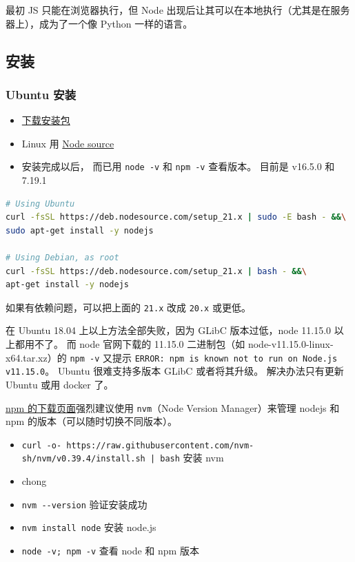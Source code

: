 

最初 JS 只能在浏览器执行，但 Node 出现后让其可以在本地执行（尤其是在服务器上），成为了一个像 Python 一样的语言。

\subsection{安装}
\subsubsection{Ubuntu 安装}
\begin{itemize}
\item \href{https://nodejs.org/en/download/package-manager/}{下载安装包}
\item Linux 用 \href{https://github.com/nodesource/distributions/blob/master/README.md#installation-instructions}{Node source}
\item 安装完成以后， 而已用 \verb`node -v` 和 \verb`npm -v` 查看版本。 目前是 v16.5.0 和 7.19.1
\end{itemize}
\begin{lstlisting}[language=bash]
# Using Ubuntu
curl -fsSL https://deb.nodesource.com/setup_21.x | sudo -E bash - &&\
sudo apt-get install -y nodejs

# Using Debian, as root
curl -fsSL https://deb.nodesource.com/setup_21.x | bash - &&\
apt-get install -y nodejs
\end{lstlisting}
如果有依赖问题，可以把上面的 \verb`21.x` 改成 \verb`20.x` 或更低。

在 Ubuntu 18.04 上以上方法全部失败，因为 GLibC 版本过低，node 11.15.0 以上都用不了。 而 node 官网下载的 11.15.0 二进制包（如 node-v11.15.0-linux-x64.tar.xz）的 \verb`npm -v` 又提示 \verb`ERROR: npm is known not to run on Node.js v11.15.0`。 Ubuntu 很难支持多版本 GLibC 或者将其升级。 解决办法只有更新 Ubuntu 或用 docker 了。

\href{https://docs.npmjs.com/downloading-and-installing-node-js-and-npm}{npm 的下载页面}强烈建议使用 \verb`nvm`（Node Version Manager）来管理 nodejs 和 npm 的版本（可以随时切换不同版本）。
\begin{itemize}
\item \verb`curl -o- https://raw.githubusercontent.com/nvm-sh/nvm/v0.39.4/install.sh | bash` 安装 nvm
\item chong
\item \verb`nvm --version` 验证安装成功
\item \verb`nvm install node` 安装 node.js
\item \verb`node -v; npm -v` 查看 node 和 npm 版本
\end{itemize}


